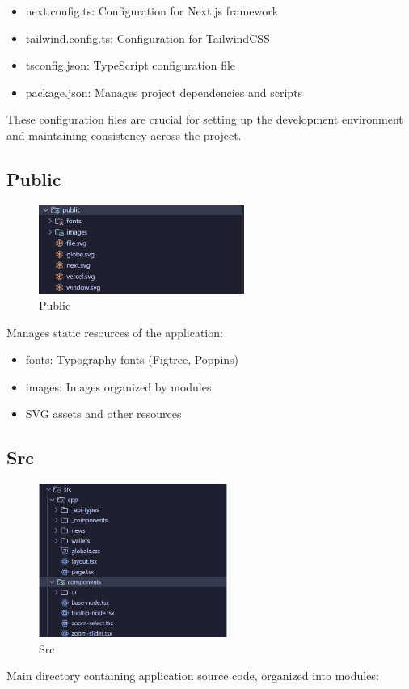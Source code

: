 \begin{itemize}
\item next.config.ts: Configuration for Next.js framework
\item tailwind.config.ts: Configuration for TailwindCSS
\item tsconfig.json: TypeScript configuration file
\item package.json: Manages project dependencies and scripts
\end{itemize}

These configuration files are crucial for setting up the development environment and maintaining consistency across the project.
\subsection{Public}
\begin{figure}[H]
    \centering
    \includegraphics[width=0.6\textwidth, keepaspectratio]{figures/Public.png}
    \caption{Public}
\end{figure}
Manages static resources of the application:

\begin{itemize}
\item fonts: Typography fonts (Figtree, Poppins)
\item images: Images organized by modules
\item SVG assets and other resources
\end{itemize}
\subsection{Src}
\begin{figure}[H]
    \centering
    \includegraphics[width=0.55\textwidth]{figures/src.png}
    \caption{Src}
\end{figure}
Main directory containing application source code, organized into modules:


